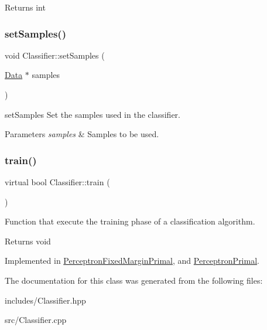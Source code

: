 \begin{DoxyReturn}{Returns}
int 
\end{DoxyReturn}
\mbox{\label{class_classifier_a4b16736670cba8f4c8397b6a90c8c799}} 
\subsubsection{\texorpdfstring{set\+Samples()}{setSamples()}}
{\footnotesize\ttfamily void Classifier\+::set\+Samples (\begin{DoxyParamCaption}\item[{\hyperlink{class_data}{Data} $\ast$}]{samples }\end{DoxyParamCaption})\hspace{0.3cm}{\ttfamily [virtual]}}



set\+Samples Set the samples used in the classifier. 


\begin{DoxyParams}{Parameters}
{\em samples} & Samples to be used. \\
\hline
\end{DoxyParams}
\mbox{\label{class_classifier_a2306a5de27555ab093593ac9642bc7d9}} 
\subsubsection{\texorpdfstring{train()}{train()}}
{\footnotesize\ttfamily virtual bool Classifier\+::train (\begin{DoxyParamCaption}{ }\end{DoxyParamCaption})\hspace{0.3cm}{\ttfamily [pure virtual]}}



Function that execute the training phase of a classification algorithm. 

\begin{DoxyReturn}{Returns}
void 
\end{DoxyReturn}


Implemented in \hyperlink{class_perceptron_fixed_margin_primal_ad41c2a42c4a819c03bf9879110b0f99f}{Perceptron\+Fixed\+Margin\+Primal}, and \hyperlink{class_perceptron_primal_a17f817a72fc7d61d1686ea77f7f9e84d}{Perceptron\+Primal}.



The documentation for this class was generated from the following files\+:\begin{DoxyCompactItemize}
\item 
includes/Classifier.\+hpp\item 
src/Classifier.\+cpp\end{DoxyCompactItemize}
